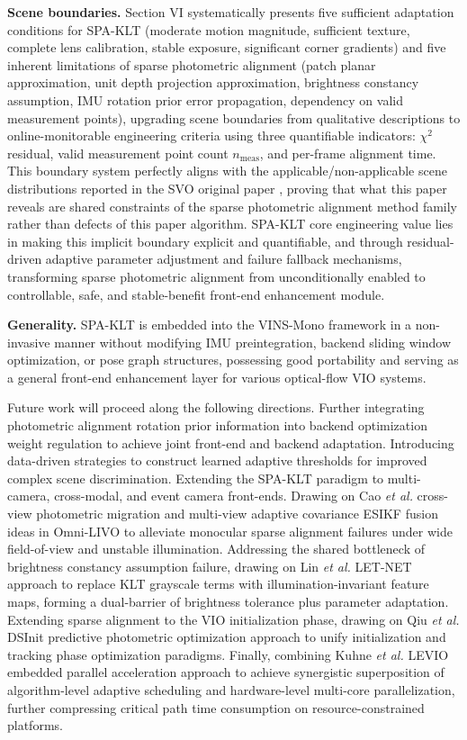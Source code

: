 \documentclass[journal,twoside,web]{ieeecolor}
\begin{document}
\textbf{Scene boundaries.} Section VI systematically presents five sufficient adaptation conditions for SPA-KLT (moderate motion magnitude, sufficient texture, complete lens calibration, stable exposure, significant corner gradients) and five inherent limitations of sparse photometric alignment (patch planar approximation, unit depth projection approximation, brightness constancy assumption, IMU rotation prior error propagation, dependency on valid measurement points), upgrading scene boundaries from qualitative descriptions to online-monitorable engineering criteria using three quantifiable indicators: $\chi^{2}$ residual, valid measurement point count $n_{\mathrm{meas}}$, and per-frame alignment time. This boundary system perfectly aligns with the applicable/non-applicable scene distributions reported in the SVO original paper \cite{forster2017svo}, proving that what this paper reveals are shared constraints of the sparse photometric alignment method family rather than defects of this paper algorithm. SPA-KLT core engineering value lies in making this implicit boundary explicit and quantifiable, and through residual-driven adaptive parameter adjustment and failure fallback mechanisms, transforming sparse photometric alignment from unconditionally enabled to controllable, safe, and stable-benefit front-end enhancement module.

\textbf{Generality.} SPA-KLT is embedded into the VINS-Mono framework in a non-invasive manner without modifying IMU preintegration, backend sliding window optimization, or pose graph structures, possessing good portability and serving as a general front-end enhancement layer for various optical-flow VIO systems.

Future work will proceed along the following directions. Further integrating photometric alignment rotation prior information into backend optimization weight regulation to achieve joint front-end and backend adaptation. Introducing data-driven strategies to construct learned adaptive thresholds for improved complex scene discrimination. Extending the SPA-KLT paradigm to multi-camera, cross-modal, and event camera front-ends. Drawing on Cao \emph{et al.} cross-view photometric migration and multi-view adaptive covariance ESIKF fusion ideas in Omni-LIVO \cite{cao2026omnilivo} to alleviate monocular sparse alignment failures under wide field-of-view and unstable illumination. Addressing the shared bottleneck of brightness constancy assumption failure, drawing on Lin \emph{et al.} LET-NET \cite{lin2024letnet} approach to replace KLT grayscale terms with illumination-invariant feature maps, forming a dual-barrier of brightness tolerance plus parameter adaptation. Extending sparse alignment to the VIO initialization phase, drawing on Qiu \emph{et al.} DSInit \cite{qiu2026dsinit} predictive photometric optimization approach to unify initialization and tracking phase optimization paradigms. Finally, combining Kuhne \emph{et al.} LEVIO \cite{kuhne2026levio} embedded parallel acceleration approach to achieve synergistic superposition of algorithm-level adaptive scheduling and hardware-level multi-core parallelization, further compressing critical path time consumption on resource-constrained platforms.
\end{document}
